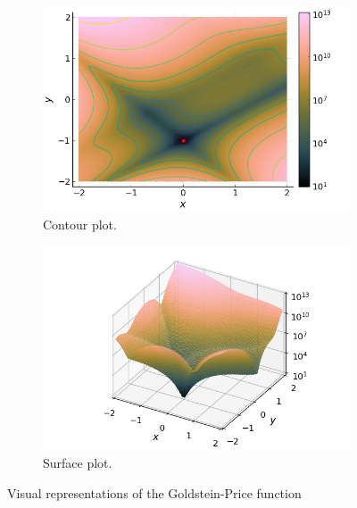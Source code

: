   \begin{figure}[ht!]
    \centering
    \begin{subfigure}[b]{0.45\textwidth}
      \centering
      \includegraphics[width=\textwidth]
        {img/test_functions/goldstein_price_contour.png}
      \caption{Contour plot.}
      \label{fig:test_functions:goldstein_price:contour}
    \end{subfigure}
    \hfill
    \begin{subfigure}[b]{0.45\textwidth}
      \centering
      \includegraphics[width=\textwidth]
        {img/test_functions/goldstein_price_surface.png}
      \caption{Surface plot.}
      \label{fig:test_functions:goldstein_price:surface}
    \end{subfigure}
    \caption{Visual representations of the Goldstein-Price function}
    \label{fig:test_functions:goldstein_price}
  \end{figure}
